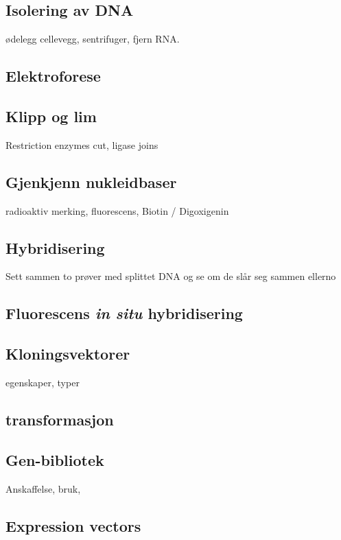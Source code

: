 \subsection{Isolering av DNA}
    ødelegg cellevegg, sentrifuger, fjern RNA.

\subsection{Elektroforese}

\subsection{Klipp og lim}
    Restriction enzymes cut, ligase joins

\subsection{Gjenkjenn nukleidbaser}
    radioaktiv merking, fluorescens, Biotin / Digoxigenin

\subsection{Hybridisering}
    Sett sammen to prøver med splittet DNA og se om de slår seg sammen ellerno

\subsection{Fluorescens \textit{in situ} hybridisering}

\subsection{Kloningsvektorer}
    egenskaper, typer

\subsection{transformasjon}

\subsection{Gen-bibliotek}
    Anskaffelse, bruk, 

\subsection{Expression vectors}

